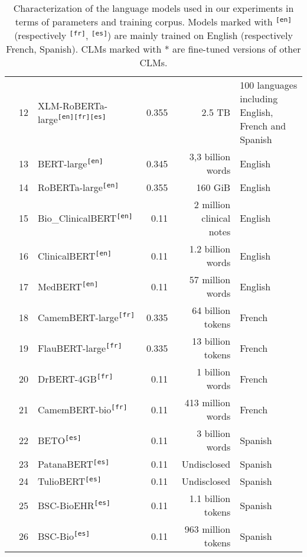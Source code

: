 \begin{table}[ht]
{\begin{tabular}{cllrrl}
 & 12 & XLM-RoBERTa-large\textsuperscript{\texttt{[en]}}\textsuperscript{\texttt{[fr]}}\textsuperscript{\texttt{[es]}} \cite{conneau2020unsupervised} & 0.355 & 2.5 TB & 100 languages including English, French and Spanish \\
 & 13 & BERT-large\textsuperscript{\texttt{[en]}} \cite{devlin2019bert} & 0.345 & 3,3 billion words & English \\
 & 14 & RoBERTa-large\textsuperscript{\texttt{[en]}} \cite{liu2019roberta} & 0.355 & 160 GiB & English \\
 & 15 & Bio\_ClinicalBERT\textsuperscript{\texttt{[en]}} \cite{alsentzer2019publicly} & 0.11 & 2 million clinical notes & English \\
 & 16 & ClinicalBERT\textsuperscript{\texttt{[en]}} \cite{wang2023optimized} & 0.11 & 1.2 billion words & English \\
 & 17 & MedBERT\textsuperscript{\texttt{[en]}} \cite{charangan2022medbert} & 0.11 & 57 million words & English \\
 & 18 & CamemBERT-large\textsuperscript{\texttt{[fr]}} \cite{martin2019camembert} & 0.335 & 64 billion tokens & French \\
 & 19 & FlauBERT-large\textsuperscript{\texttt{[fr]}} \cite{le2019flaubert} & 0.335 & 13 billion tokens & French \\
 & 20 & DrBERT-4GB\textsuperscript{\texttt{[fr]}} \cite{labrak2023drbert} & 0.11 & 1 billion words & French \\
 & 21 & CamemBERT-bio\textsuperscript{\texttt{[fr]}} \cite{touchent2023camembertbio} & 0.11 & 413 million words & French \\
 & 22 & BETO\textsuperscript{\texttt{[es]}} \cite{canete2020beto} & 0.11 & 3 billion words & Spanish \\
 & 23 & PatanaBERT\textsuperscript{\texttt{[es]}} & 0.11 & Undisclosed & Spanish \\
 & 24 & TulioBERT\textsuperscript{\texttt{[es]}} & 0.11 & Undisclosed & Spanish \\
 & 25 & BSC-BioEHR\textsuperscript{\texttt{[es]}} \cite{carrino2022pretrained} & 0.11 & 1.1 billion tokens & Spanish \\
 & 26 & BSC-Bio\textsuperscript{\texttt{[es]}} \cite{carrino2022pretrained} & 0.11 & 963 million tokens & Spanish \\
\bottomrule
\end{tabular}}
\caption{Characterization of the language models used in our experiments in terms of parameters and training corpus. Models marked with \textsuperscript{\texttt{[en]}} (respectively \textsuperscript{\texttt{[fr]}}, \textsuperscript{\texttt{[es]}}) are mainly trained on English (respectively French, Spanish). CLMs marked with * are fine-tuned versions of other CLMs.}
\label{tab:LM_features}
\end{table}
